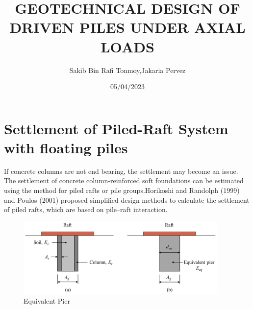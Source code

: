 \documentclass[12pt]{article}
\title{GEOTECHNICAL DESIGN OF DRIVEN PILES UNDER AXIAL LOADS}
\author{Sakib Bin Rafi Tonmoy,Jakaria Pervez}
\date{05/04/2023}
\begin{document}
\maketitle

\section{Settlement of Piled-Raft System with floating piles }
 If concrete columns are not end bearing, the settlement may become an issue. The settlement of concrete column-reinforced soft foundations can be estimated using the method for piled rafts or pile groups.Horikoshi and Randolph (1999) and Poulos (2001) proposed simplified design methods to calculate the settlement of piled rafts, which are based on pile–raft interaction. \\
 
 
\begin{figure}[h]
\centering
\includegraphics{Equivalent_Pier}
\caption{Equivalent Pier}
\label{fig:eqv_pier}
\end{figure}

\end{document}
